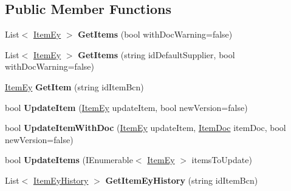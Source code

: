 \subsection*{Public Member Functions}
\begin{DoxyCompactItemize}
\item 
\mbox{\label{interface_h_k_supply_1_1_services_1_1_interfaces_1_1_i_item_ey_a3d40d9277536c1d27dbc654e625b1e05}} 
List$<$ \mbox{\hyperlink{class_h_k_supply_1_1_models_1_1_item_ey}{Item\+Ey}} $>$ {\bfseries Get\+Items} (bool with\+Doc\+Warning=false)
\item 
\mbox{\label{interface_h_k_supply_1_1_services_1_1_interfaces_1_1_i_item_ey_a6ed3fd543a83871a27bf46c6585c997c}} 
List$<$ \mbox{\hyperlink{class_h_k_supply_1_1_models_1_1_item_ey}{Item\+Ey}} $>$ {\bfseries Get\+Items} (string id\+Default\+Supplier, bool with\+Doc\+Warning=false)
\item 
\mbox{\label{interface_h_k_supply_1_1_services_1_1_interfaces_1_1_i_item_ey_a6f88621156d8efd145e2398ee825412c}} 
\mbox{\hyperlink{class_h_k_supply_1_1_models_1_1_item_ey}{Item\+Ey}} {\bfseries Get\+Item} (string id\+Item\+Bcn)
\item 
\mbox{\label{interface_h_k_supply_1_1_services_1_1_interfaces_1_1_i_item_ey_acd255777cb31afd6a675e55d12c7af90}} 
bool {\bfseries Update\+Item} (\mbox{\hyperlink{class_h_k_supply_1_1_models_1_1_item_ey}{Item\+Ey}} update\+Item, bool new\+Version=false)
\item 
\mbox{\label{interface_h_k_supply_1_1_services_1_1_interfaces_1_1_i_item_ey_a56332392cbef11609eeba0b6444ffa10}} 
bool {\bfseries Update\+Item\+With\+Doc} (\mbox{\hyperlink{class_h_k_supply_1_1_models_1_1_item_ey}{Item\+Ey}} update\+Item, \mbox{\hyperlink{class_h_k_supply_1_1_models_1_1_item_doc}{Item\+Doc}} item\+Doc, bool new\+Version=false)
\item 
\mbox{\label{interface_h_k_supply_1_1_services_1_1_interfaces_1_1_i_item_ey_aa2b883ab0258c113e023fcbebc36a5f4}} 
bool {\bfseries Update\+Items} (I\+Enumerable$<$ \mbox{\hyperlink{class_h_k_supply_1_1_models_1_1_item_ey}{Item\+Ey}} $>$ items\+To\+Update)
\item 
\mbox{\label{interface_h_k_supply_1_1_services_1_1_interfaces_1_1_i_item_ey_a2c2e79edc89482917b8c1ed47f6b2fd1}} 
List$<$ \mbox{\hyperlink{class_h_k_supply_1_1_models_1_1_item_ey_history}{Item\+Ey\+History}} $>$ {\bfseries Get\+Item\+Ey\+History} (string id\+Item\+Bcn)
\end{DoxyCompactItemize}


